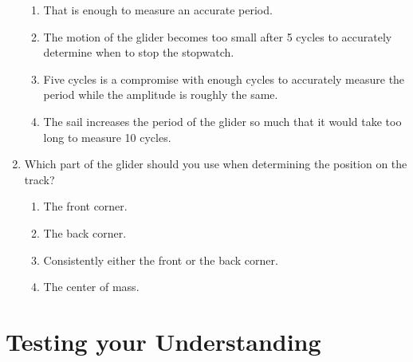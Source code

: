 \begin{enumerate}
  \begin{enumerate}
  \item That is enough to measure an accurate period.
  \item The motion of the glider becomes too small after 5 cycles to accurately determine when to stop the stopwatch.
  \item Five cycles is a compromise with enough cycles to accurately measure the period while the amplitude is roughly the same.
  \item The sail increases the period of the glider so much that it would take too long to measure 10 cycles.
  \end{enumerate}
\item Which part of the glider should you use when determining the position on the track?
  \begin{enumerate}
  \item The front corner.
  \item The back corner.
  \item Consistently either the front or the back corner.
  \item The center of mass.
  \end{enumerate}

\end{enumerate}






\section{Testing your Understanding}

